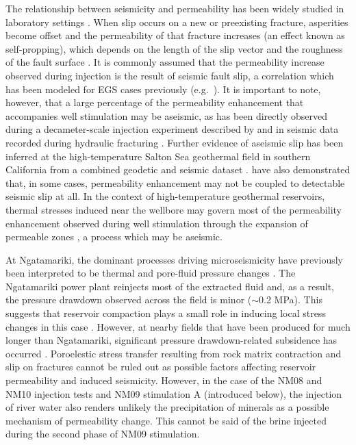 The relationship between seismicity and \gls{permeability} has been widely studied in laboratory settings \citep[e.g.][and references therein]{Lee_2002}. When slip occurs on a new or preexisting fracture, asperities become offset and the \gls{permeability} of that fracture increases (an effect known as self-propping), which depends on the length of the slip vector and the roughness of the fault surface \citep{Ishibashi_2018,Esaki_1999,Fang_2017}. It is commonly assumed that the \gls{permeability} increase observed during injection is the result of seismic fault slip, a correlation which has been modeled for EGS cases previously (e.g.\ \citet{Baisch_2010}). It is important to note, however, that a large percentage of the \gls{permeability} enhancement that accompanies well \gls{stimulation} may be aseismic, as has been directly observed during a decameter-scale injection experiment described by \citet{Guglielmi_2015} and in seismic data recorded during hydraulic fracturing \citep{Das_2011}. Further evidence of aseismic slip has been inferred at the high-temperature Salton Sea geothermal field in southern California from a combined geodetic and seismic dataset \cite{Wei_2015}. \citet{Riffault_2018} have also demonstrated that, in some cases, \gls{permeability} enhancement may not be coupled to detectable seismic slip at all. In the context of high-temperature geothermal reservoirs, thermal stresses induced near the wellbore may govern most of the \gls{permeability} enhancement observed during well \gls{stimulation} through the expansion of permeable zones \citep{grant2013thermal,siega_2014}, a process which may be aseismic.

At Ngatamariki, the dominant processes driving microseismicity have previously been interpreted to be thermal and pore-fluid pressure changes \citep{Sherburn_2015,grant2013thermal}. The Ngatamariki power plant reinjects most of the extracted fluid and, as a result, the pressure drawdown observed across the field is minor ($\sim$0.2 MPa). This suggests that reservoir compaction plays a small role in inducing local stress changes in this case \citep{quinao_2017}. However, at nearby fields that have been produced for much longer than Ngatamariki, significant pressure drawdown-related subsidence has occurred \citep{Allis_2000}. Poroelestic stress transfer resulting from rock matrix contraction and slip on fractures cannot be ruled out as possible factors affecting reservoir \gls{permeability} and induced seismicity. However, in the case of the NM08 and NM10 injection tests and NM09 stimulation A (introduced below), the injection of river water also renders unlikely the precipitation of minerals as a possible mechanism of \gls{permeability} change. This cannot be said of the brine injected during the second phase of NM09 stimulation.

